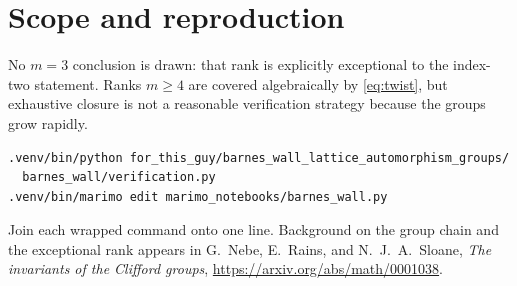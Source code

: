 \documentclass[11pt]{article}
\begin{document}
\section{Scope and reproduction}
No $m=3$ conclusion is drawn: that rank is explicitly exceptional to the
index-two statement.  Ranks $m\geq4$ are covered algebraically by
\eqref{eq:twist}, but exhaustive closure is not a reasonable verification
strategy because the groups grow rapidly.
\begin{verbatim}
.venv/bin/python for_this_guy/barnes_wall_lattice_automorphism_groups/
  barnes_wall/verification.py
.venv/bin/marimo edit marimo_notebooks/barnes_wall.py
\end{verbatim}
Join each wrapped command onto one line.  Background on the group chain and
the exceptional rank appears in G.~Nebe, E.~Rains, and N.~J.~A.~Sloane,
\emph{The invariants of the Clifford groups},
\url{https://arxiv.org/abs/math/0001038}.
\end{document}
